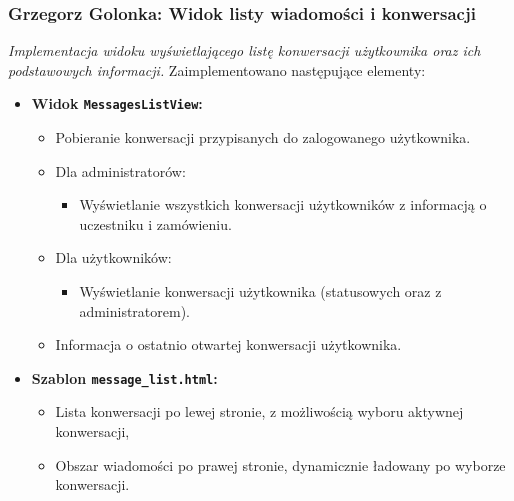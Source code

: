 \documentclass[12pt,a4paper,oneside]{article}
\theoremstyle{definition}
\numberwithin{equation}{section}
\begin{document}
\subsubsection{Grzegorz Golonka: Widok listy wiadomości i konwersacji}
\label{section:1.3.32}
\textit{
Implementacja widoku wyświetlającego listę konwersacji użytkownika oraz ich podstawowych informacji.
}
Zaimplementowano następujące elementy:
\begin{itemize}
    \item \textbf{Widok \texttt{MessagesListView}:}
    \begin{itemize}
        \item Pobieranie konwersacji przypisanych do zalogowanego użytkownika.
        \item Dla administratorów:
        \begin{itemize}
            \item Wyświetlanie wszystkich konwersacji użytkowników z informacją o uczestniku i zamówieniu.
        \end{itemize}
        \item Dla użytkowników:
        \begin{itemize}
            \item Wyświetlanie konwersacji użytkownika (statusowych oraz z administratorem).
        \end{itemize}
        \item Informacja o ostatnio otwartej konwersacji użytkownika.
    \end{itemize}
    \item \textbf{Szablon \texttt{message\_list.html}:}
    \begin{itemize}
        \item Lista konwersacji po lewej stronie, z możliwością wyboru aktywnej konwersacji,
        \item Obszar wiadomości po prawej stronie, dynamicznie ładowany po wyborze konwersacji.
    \end{itemize}
\end{itemize}
%
%
\end{document}
